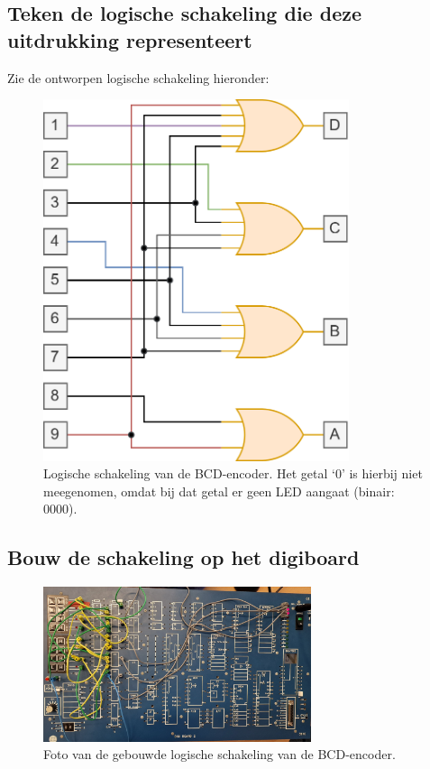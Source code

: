 \documentclass[12pt]{article}
\begin{document}
\subsection{Teken de logische schakeling die deze uitdrukking representeert}
Zie de ontworpen logische schakeling hieronder:
\begin{figure}[h]
    \centering
    \includegraphics[width=0.8\textwidth]{bcd.png}
    \caption{Logische schakeling van de BCD-encoder. Het getal `0' is hierbij niet meegenomen, omdat bij dat getal er geen LED aangaat (binair: 0000).}
    \label{fig:bcd}
\end{figure}
\pagebreak
\subsection{Bouw de schakeling op het digiboard}
\begin{figure}[h]
    \centering
    \includegraphics[width=0.7\textwidth]{bcdled.jpg}
    \caption{Foto van de gebouwde logische schakeling van de BCD-encoder.}
    \label{fig:bcdled}
\end{figure}
\end{document}
